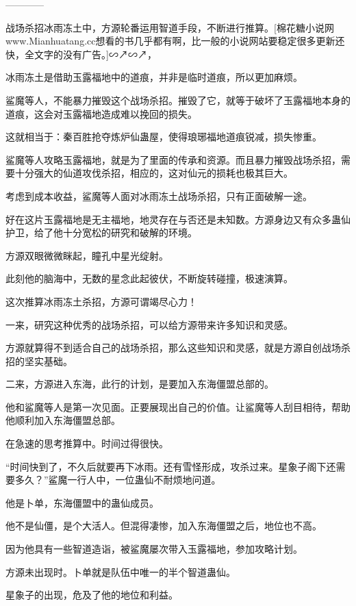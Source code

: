 
\begin{this_body}

------------

战场杀招冰雨冻土中，方源轮番运用智道手段，不断进行推算。[棉花糖小说网www.Mianhuatang.cc想看的书几乎都有啊，比一般的小说网站要稳定很多更新还快，全文字的没有广告。]∽↗∽↗，

冰雨冻土是借助玉露福地中的道痕，并非是临时道痕，所以更加麻烦。

鲨魔等人，不能暴力摧毁这个战场杀招。摧毁了它，就等于破坏了玉露福地本身的道痕，这会对玉露福地造成难以挽回的损失。

这就相当于：秦百胜抢夺炼炉仙蛊屋，使得琅琊福地道痕锐减，损失惨重。

鲨魔等人攻略玉露福地，就是为了里面的传承和资源。而且暴力摧毁战场杀招，需要十分强大的仙道攻伐杀招，相应的，这对仙元的损耗也极其巨大。

考虑到成本收益，鲨魔等人面对冰雨冻土战场杀招，只有正面破解一途。

好在这片玉露福地是无主福地，地灵存在与否还是未知数。方源身边又有众多蛊仙护卫，给了他十分宽松的研究和破解的环境。

方源双眼微微眯起，瞳孔中星光绽射。

此刻他的脑海中，无数的星念此起彼伏，不断旋转碰撞，极速演算。

这次推算冰雨冻土杀招，方源可谓竭尽心力！

一来，研究这种优秀的战场杀招，可以给方源带来许多知识和灵感。

方源就算得不到适合自己的战场杀招，那么这些知识和灵感，就是方源自创战场杀招的坚实基础。

二来，方源进入东海，此行的计划，是要加入东海僵盟总部的。

他和鲨魔等人是第一次见面。正要展现出自己的价值。让鲨魔等人刮目相待，帮助他顺利加入东海僵盟总部。

在急速的思考推算中。时间过得很快。

“时间快到了，不久后就要再下冰雨。还有雪怪形成，攻杀过来。星象子阁下还需要多久？”鲨魔一行人中，一位蛊仙不耐烦地问道。

他是卜单，东海僵盟中的蛊仙成员。

他不是仙僵，是个大活人。但混得凄惨，加入东海僵盟之后，地位也不高。

因为他具有一些智道造诣，被鲨魔屡次带入玉露福地，参加攻略计划。

方源未出现时。卜单就是队伍中唯一的半个智道蛊仙。

星象子的出现，危及了他的地位和利益。


\end{this_body}
